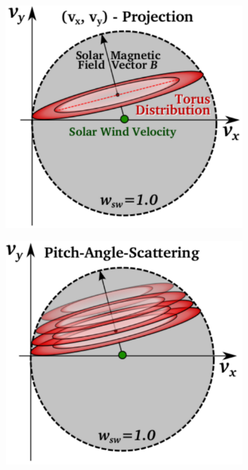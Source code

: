 \begin{figure}
	\centering
	\begin{subfigure}{.32\textwidth}
		\centering
		\includegraphics[width=1.\linewidth]{Figures/torus.pdf}
	\end{subfigure}%
	\begin{subfigure}{.32\textwidth}
		\centering
		\includegraphics[width=1.\linewidth]{Figures/PAS.pdf}

\end{subfigure}
\end{figure}
